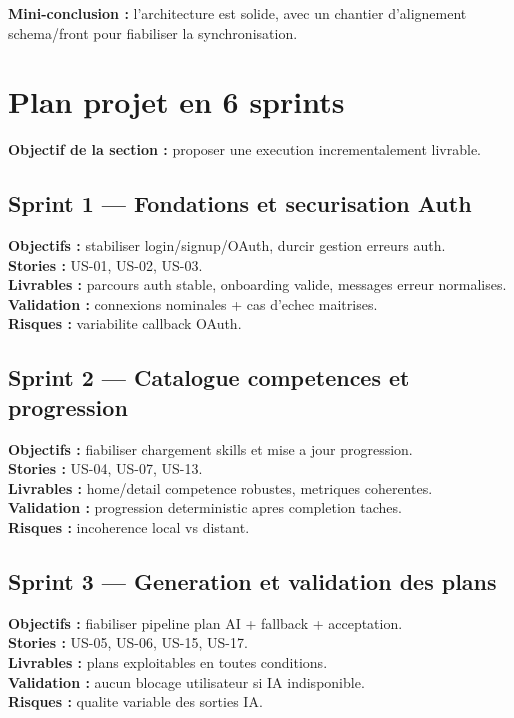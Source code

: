 \documentclass[12pt,a4paper]{article}
\begin{document}
\textbf{Mini-conclusion :} l'architecture est solide, avec un chantier d'alignement schema/front pour fiabiliser la synchronisation.

\section{Plan projet en 6 sprints}
\textbf{Objectif de la section :} proposer une execution incrementalement livrable.

\subsection*{Sprint 1 --- Fondations et securisation Auth}
\textbf{Objectifs :} stabiliser login/signup/OAuth, durcir gestion erreurs auth.\\
\textbf{Stories :} US-01, US-02, US-03.\\
\textbf{Livrables :} parcours auth stable, onboarding valide, messages erreur normalises.\\
\textbf{Validation :} connexions nominales + cas d'echec maitrises.\\
\textbf{Risques :} variabilite callback OAuth.

\subsection*{Sprint 2 --- Catalogue competences et progression}
\textbf{Objectifs :} fiabiliser chargement skills et mise a jour progression.\\
\textbf{Stories :} US-04, US-07, US-13.\\
\textbf{Livrables :} home/detail competence robustes, metriques coherentes.\\
\textbf{Validation :} progression deterministic apres completion taches.\\
\textbf{Risques :} incoherence local vs distant.

\subsection*{Sprint 3 --- Generation et validation des plans}
\textbf{Objectifs :} fiabiliser pipeline plan AI + fallback + acceptation.\\
\textbf{Stories :} US-05, US-06, US-15, US-17.\\
\textbf{Livrables :} plans exploitables en toutes conditions.\\
\textbf{Validation :} aucun blocage utilisateur si IA indisponible.\\
\textbf{Risques :} qualite variable des sorties IA.
\end{document}
